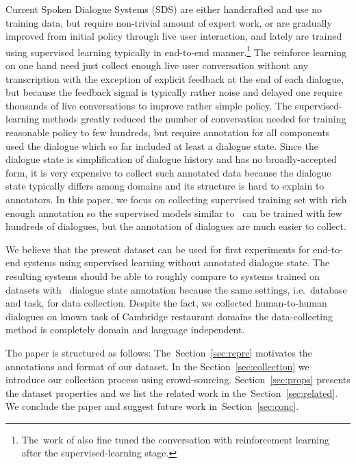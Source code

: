 \documentclass[runningheads,a4paper]{llncs}
\begin{document}
Current Spoken Dialogue Systems (SDS) are either handcrafted and use no training data\cite{duvsek2014alex,raux2005let}, but require non-trivial amount of expert work, or are gradually improved from initial policy through live user interaction\cite{young2010hidden,gasic2011line}, and lately are trained using supervised learning typically in end-to-end manner\cite{wen2016network,williams2016end}.\footnote{The~work of \cite{williams2016end} also fine tuned the conversation with reinforcement learning after the supervised-learning stage.}
The reinforce learning on one hand need just collect enough live user conversation without any transcription with the exception of explicit feedback at the end of each dialogue, but because the feedback signal is typically rather noise and delayed one require thousands of live conversations to improve rather simple policy.\cite{gasic2011line}
The supervised-learning methods greatly reduced the number of conversation needed for training reasonable policy to few hundreds\cite{wen2016network}, but require annotation for all components used the dialogue which so far included at least a dialogue state\cite{wen2016network,young2010hidden}.
Since the dialogue state is simplification of dialogue history and has no broadly-accepted form, it is very expensive to collect such annotated data because the dialogue state typically differs among domains and its structure is hard to explain to annotators.
In this paper, we focus on collecting supervised training set with rich enough annotation so the supervised models similar to~\cite{wen2016network} can be trained with few hundreds of dialogues, but the annotation of dialogues are much easier to collect.

We believe that the present dataset can be used for first experiments for end-to-end systems using supervised learning without annotated dialogue state.
The resulting systems should be able to roughly compare to systems trained on datasets with~\cite{williams2013dstc1,henderson2014dstc2,henderson2014dstc3} dialogue state annotation because the same settings, i.e.\ database and task, for data collection.
Despite the fact, we collected human-to-human dialogues on known task of Cambridge restaurant domains the data-collecting method is completely domain and language independent.

The paper is structured as follows: The~Section~\ref{sec:repre} motivates the annotations and format of our dataset.
In the Section~\ref{sec:collection} we introduce our collection process using crowd-sourcing.
Section~\ref{sec:props} presents the dataset properties and we list the related work in the~Section~\ref{sec:related}.
We conclude the paper and suggest future work in~Section~\ref{sec:conc}.
\end{document}
